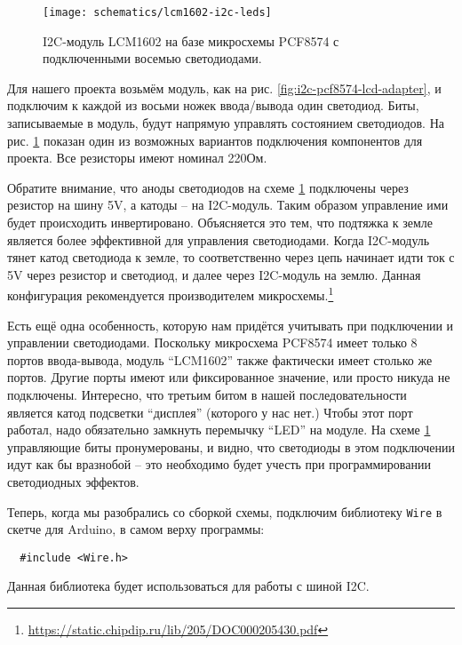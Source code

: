 \documentclass[../sparc.tex]{subfiles}
\begin{document}
\begin{figure}[H]
  \centering
  \texttt{[image: schematics/lcm1602-i2c-leds]}
  \caption{I2C-модуль LCM1602 на базе микросхемы PCF8574 с подключенными восемью
    светодиодами.}
  \label{fig:lcm1602-i2c-leds}
\end{figure}

Для нашего проекта возьмём модуль, как на рис.
\ref{fig:i2c-pcf8574-lcd-adapter}, и подключим к каждой из восьми ножек
ввода/вывода один светодиод.  Биты, записываемые в модуль, будут напрямую
управлять состоянием светодиодов.  На рис. \ref{fig:lcm1602-i2c-leds} показан
один из возможных вариантов подключения компонентов для проекта.  Все резисторы
имеют номинал 220Ом.

Обратите внимание, что аноды светодиодов на схеме \ref{fig:lcm1602-i2c-leds}
подключены через резистор на шину 5V, а катоды -- на I2C-модуль.  Таким образом
управление ими будет происходить инвертировано.  Объясняется это тем, что
подтяжка к земле является более эффективной для управления светодиодами.  Когда
I2C-модуль тянет катод светодиода к земле, то соответственно через цепь начинает
идти ток с 5V через резистор и светодиод, и далее через I2C-модуль на землю.
Данная конфигурация рекомендуется производителем
микросхемы.\footnote{\url{https://static.chipdip.ru/lib/205/DOC000205430.pdf}}

Есть ещё одна особенность, которую нам придётся учитывать при подключении и
управлении светодиодами.  Поскольку микросхема PCF8574 имеет только 8 портов
ввода-вывода, модуль ``LCM1602'' также фактически имеет столько же портов.
Другие порты имеют или фиксированное значение, или просто никуда не подключены.
Интересно, что третьим битом в нашей последовательности является катод подсветки
``дисплея'' (которого у нас нет.)  Чтобы этот порт работал, надо обязательно
замкнуть перемычку ``LED'' на модуле.  На схеме \ref{fig:lcm1602-i2c-leds}
управляющие биты пронумерованы, и видно, что светодиоды в этом подключении идут
как бы вразнобой -- это необходимо будет учесть при программировании светодиодных
эффектов.

Теперь, когда мы разобрались со сборкой схемы, подключим библиотеку
\texttt{Wire} в скетче для Arduino, в самом верху программы:

\begin{verbatim}
  #include <Wire.h>
\end{verbatim}

Данная библиотека будет использоваться для работы с шиной I2C.
\end{document}
